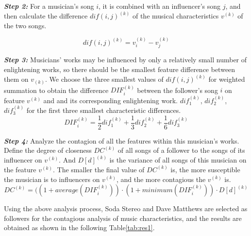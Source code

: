 \documentclass[12pt]{article}  %
\newenvironment{shrinkeq}[1]
{ \bgroup
	\addtolength\abovedisplayshortskip{#1}
	\addtolength\abovedisplayskip{#1}
	\addtolength\belowdisplayshortskip{#1}
	\addtolength\belowdisplayskip{#1}}
{\egroup\ignorespacesafterend}
\begin{document}
\textbf{\emph{Step 2:}} For a musician's song $i$, it is combined with an influencer's song $j$, and then calculate the difference $dif(i,j)^{(k)}$ of the musical characteristics $v^{(k)}$ of the two songs.

\begin{shrinkeq}{-1.5ex}
	\begin{equation}
		dif(i,j)^{(k)}=v_{i}^{(k)}-v_j^{(k)}
	\end{equation}
\end{shrinkeq}

\textbf{\emph{Step 3:}} Musicians' works may be influenced by only a relatively small number of enlightening works, so there should be the smallest feature difference between them on $v_{(k)}$. We choose the three smallest values of $dif(i,j)^{(k)}$ for weighted summation to obtain the difference $DIF_i^{(k)}$ between the follower's song $i$ on feature $v^{(k)}$ and and its corresponding enlightening work. $dif^{(k)}_1$, $dif^{(k)}_2$, $dif^{(k)}_3$ for the first three smallest characteristic differences.
\begin{shrinkeq}{-1.5ex}
	\begin{equation}
		DIF_i^{(k)}=\frac{1}{2}dif^{(k)}_1+\frac{1}{3}dif^{(k)}_2+\frac{1}{6}dif^{(k)}_3
	\end{equation}
\end{shrinkeq}

\textbf{\emph{Step 4:}} Analyze the contagion of all the features within this musician's works. Define the degree of closeness $DC^{(k)}$ of all songs of a follower to the songs of its influencer on $v^{(k)}$. And $D[d]^{(k)}$ is the variance of all songs of this musician on the feature $v^{(k)}$. The smaller the final value of $DC^{(k)}$ is, the more susceptible the musician is to influencers on $v^{(k)}$, and the more contagious the $v^{(k)}$ is.
\begin{shrinkeq}{-1.5ex}
	\begin{equation}
		DC^{(k)}=((1+average(DIF_i^{(k)}))\cdot(1+minimum(DIF_i^{(k)}))\cdot D[d]^{(k)}
	\end{equation}
\end{shrinkeq}

Using the above analysis process, Soda Stereo and Dave Matthews are selected as followers for the contagious analysis of music characteristics, and the results are obtained as shown in the following Table\eqref{tab:res1}.
\end{document}
